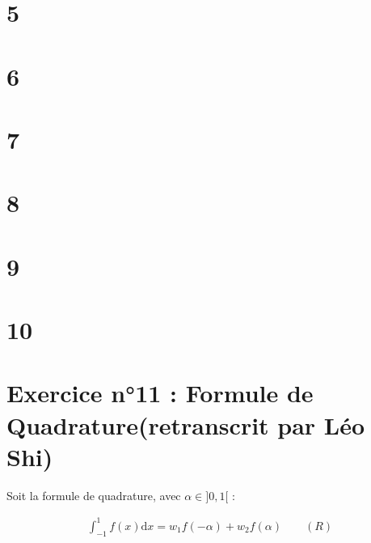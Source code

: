 \documentclass[a4paper]{article}
\begin{document}
\section*{5}
\section*{6}
\section*{7}
\section*{8}
\section*{9}
\section*{10}
\section*{Exercice n°11 : Formule de Quadrature(retranscrit par Léo Shi)}

Soit la formule de quadrature, avec $\alpha \in ]0,1[$ : 

\begin{align*}
\int^1_{-1} f(x) \text{d}x = w_1 f(-\alpha)+w_2 f(\alpha) \qquad (R)
\end{align*}
\end{document}
